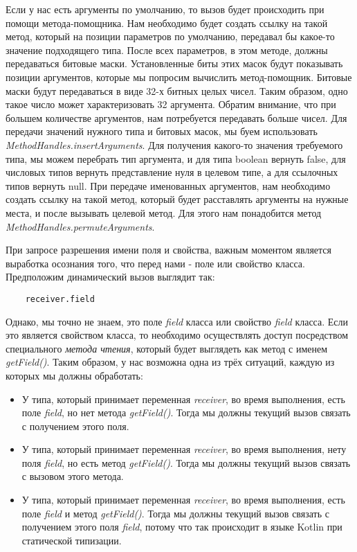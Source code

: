 Если у нас есть аргументы по умолчанию, то вызов будет происходить при помощи метода-помощника. Нам необходимо будет создать ссылку на такой метод, который на позиции параметров по умолчанию, передавал бы какое-то значение подходящего типа. После всех параметров, в этом методе, должны передаваться битовые маски. Установленные биты этих масок будут показывать позиции
аргументов, которые мы попросим вычислить метод-помощник. Битовые маски будут передаваться в виде 32-х битных целых чисел. Таким образом, одно такое число может характеризовать 32 аргумента. Обратим внимание, что при большем количестве аргументов, нам потребуется передавать больше чисел. Для передачи значений нужного типа и битовых масок, мы буем использовать \textit{MethodHandles.insertArguments}. Для получения какого-то значения требуемого типа, мы можем перебрать тип аргумента, и для типа boolean вернуть false, для числовых типов вернуть представление нуля в целевом типе, а для ссылочных типов вернуть null.
При передаче именованных аргументов, нам необходимо создать ссылку на такой метод, который будет расставлять аргументы на нужные места, и после вызывать целевой метод. Для этого нам понадобится метод \textit{MethodHandles.permuteArguments}.

При запросе разрешения имени поля и свойства, важным моментом является выработка осознания того, что перед нами - поле или свойство класса. Предположим динамический вызов выглядит так:

\begin{verbatim}
    receiver.field
\end{verbatim}

Однако, мы точно не знаем, это поле \textit{field} класса или свойство \textit{field} класса. Если это является свойством класса, то необходимо осуществлять доступ посредством специального \textit{метода чтения}, который будет выглядеть как метод с именем \textit{getField()}. Таким образом, у нас возможна одна из трёх ситуаций, каждую из которых мы должны обработать:

\begin{itemize}
    \item У типа, который принимает переменная \textit{receiver}, во время выполнения, есть поле \textit{field}, но нет метода \textit{getField()}. Тогда мы должны текущий вызов связать с получением этого поля.
    \item У типа, который принимает переменная \textit{receiver}, во время выполнения, нету поля \textit{field}, но есть метод \textit{getField()}. Тогда мы должны текущий вызов связать с вызовом этого метода.
    \item У типа, который принимает переменная \textit{receiver}, во время выполнения, есть поле \textit{field} и метод \textit{getField()}. Тогда мы должны текущий вызов связать с получением этого поля \textit{field}, потому что так происходит в языке Kotlin при статической типизации.
\end{itemize}






